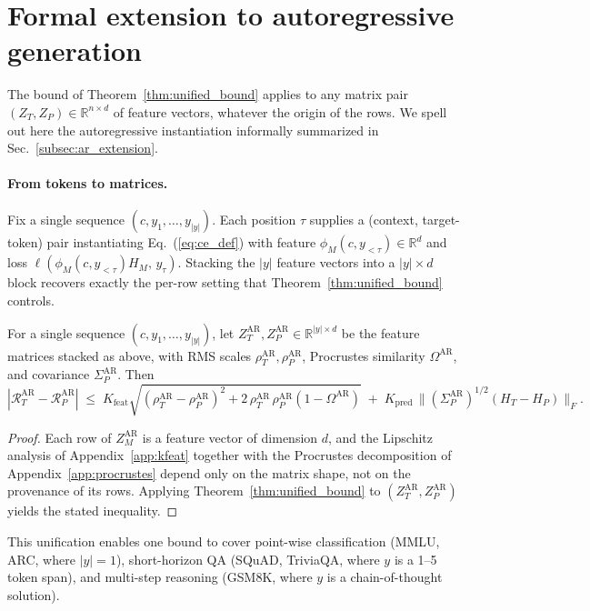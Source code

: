 
\section{Formal extension to autoregressive generation}
\label{app:ar_extension}

The bound of Theorem~\ref{thm:unified_bound} applies to any matrix pair $(Z_T, Z_P) \in \mathbb{R}^{n \times d}$ of feature vectors, whatever the origin of the rows. We spell out here the autoregressive instantiation informally summarized in Sec.~\ref{subsec:ar_extension}.

\paragraph{From tokens to matrices.}
Fix a single sequence $(c, y_1, \ldots, y_{|y|})$. Each position $\tau$ supplies a (context, target-token) pair instantiating Eq.~(\ref{eq:ce_def}) with feature $\phi_M(c, y_{<\tau}) \in \mathbb{R}^d$ and loss $\ell(\phi_M(c, y_{<\tau}) H_M,\, y_\tau)$. Stacking the $|y|$ feature vectors into a $|y| \times d$ block recovers exactly the per-row setting that Theorem~\ref{thm:unified_bound} controls.

\begin{corollary}
\label{cor:ar_bound}
For a single sequence $(c, y_1, \ldots, y_{|y|})$, let $Z_T^{\mathrm{AR}}, Z_P^{\mathrm{AR}} \in \mathbb{R}^{|y| \times d}$ be the feature matrices stacked as above, with RMS scales $\rho_T^{\mathrm{AR}}, \rho_P^{\mathrm{AR}}$, Procrustes similarity $\Omega^{\mathrm{AR}}$, and covariance $\Sigma_P^{\mathrm{AR}}$. Then
\begin{equation}
\label{eq:ar_bound}
|\mathcal{R}_T^{\mathrm{AR}} - \mathcal{R}_P^{\mathrm{AR}}| \;\le\; K_{\mathrm{feat}} \sqrt{(\rho_T^{\mathrm{AR}} - \rho_P^{\mathrm{AR}})^2 + 2\,\rho_T^{\mathrm{AR}}\,\rho_P^{\mathrm{AR}}(1 - \Omega^{\mathrm{AR}})} \;+\; K_{\mathrm{pred}} \,\big\|(\Sigma_P^{\mathrm{AR}})^{1/2}(H_T - H_P)\big\|_F.
\end{equation}
\end{corollary}

\begin{proof}
Each row of $Z_M^{\mathrm{AR}}$ is a feature vector of dimension $d$, and the Lipschitz analysis of Appendix~\ref{app:kfeat} together with the Procrustes decomposition of Appendix~\ref{app:procrustes} depend only on the matrix shape, not on the provenance of its rows. Applying Theorem~\ref{thm:unified_bound} to $(Z_T^{\mathrm{AR}}, Z_P^{\mathrm{AR}})$ yields the stated inequality.
\end{proof}

This unification enables one bound to cover point-wise classification (MMLU, ARC, where $|y|{=}1$), short-horizon QA (SQuAD, TriviaQA, where $y$ is a 1--5 token span), and multi-step reasoning (GSM8K, where $y$ is a chain-of-thought solution).
